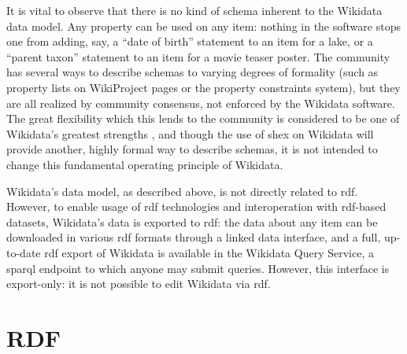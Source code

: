It is vital to observe that there is no kind of schema inherent to the Wikidata data model.
Any property can be used on any item:
nothing in the software stops one from adding, say,
a “date of birth” statement to an item for a lake,
or a “parent taxon” statement to an item for a movie teaser poster.
The community has several ways to describe schemas to varying degrees of formality
(such as property lists on WikiProject pages or the property constraints system),
but they are all realized by community consensus,
not enforced by the Wikidata software.
The great flexibility which this lends to the community
is considered to be one of Wikidata’s greatest strengths \cite{vrandecic-restricting-the-world},
and though the use of \gls{shex}
on Wikidata will provide another,
highly formal way to describe schemas,
it is not intended to change this fundamental operating principle of Wikidata. %

Wikidata’s data model, as described above,
is not directly related to \gls{rdf}.
However, to enable usage of \gls{rdf} technologies and interoperation with \gls{rdf}-based datasets,
Wikidata’s data is exported to \gls{rdf}:
the data about any item can be downloaded in various \gls{rdf} formats through a linked data interface, %
and a full, up-to-date \gls{rdf} export of Wikidata is available in the Wikidata Query Service,
a \acrshort{sparql} endpoint to which anyone may submit queries.
However, this interface is export-only:
it is not possible to edit Wikidata via \gls{rdf}.


\section{RDF}
\label{sec:Background:RDF}

